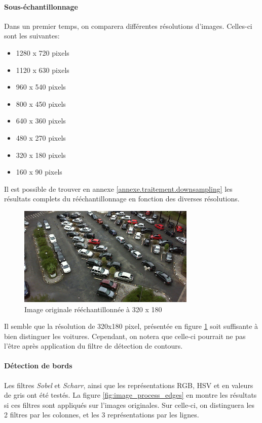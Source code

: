 \paragraph{Sous-échantillonnage}\label{conception.traitement.eval.downsample}
Dans un premier temps, on comparera différentes résolutions d'images. Celles-ci sont les suivantes:
\begin{itemize}
    \item 1280 x 720 pixels
    \item 1120 x 630 pixels
    \item 960 x 540 pixels
    \item 800 x 450 pixels
    \item 640 x 360 pixels
    \item 480 x 270 pixels
    \item 320 x 180 pixels
    \item 160 x 90 pixels
\end{itemize}

Il est possible de trouver en annexe \ref{annexe.traitement.downsampling} les résultats complets du rééchantillonnage en fonction des diverses résolutions.

\begin{figure}[ht]
    \centering
    \includegraphics[width=.5\linewidth]{img/conception/image_process/downsample_only/1.png}
    \caption{Image originale rééchantillonnée à 320 x 180}
    \label{fig:downsample_choice}
\end{figure}

Il semble que la résolution de 320x180 pixel, présentée en figure \ref{fig:downsample_choice} soit suffisante à bien distinguer les voitures. Cependant, on notera que celle-ci pourrait ne pas l'être après application du filtre de détection de contours.

\paragraph{Détection de bords}

Les filtres \textit{Sobel} et \textit{Scharr}, ainsi que les représentations RGB, HSV et en valeurs de gris ont été testés. La figure \ref{fig:image_process_edges} en montre les résultats si ces filtres sont appliqués sur l'images originales. Sur celle-ci, on distinguera les 2 filtres par les colonnes, et les 3 représentations par les lignes.

